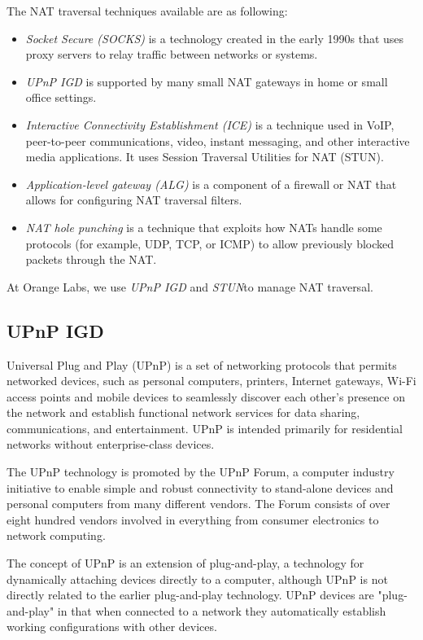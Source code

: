 The NAT traversal techniques available are as following:
\begin{itemize}
  \item \textit{Socket Secure (SOCKS)} is a technology created in the early 1990s that uses proxy servers to relay traffic between networks or systems.
  \item \textit{UPnP IGD} is supported by many small NAT gateways in home or small office settings.
  \item \textit{Interactive Connectivity Establishment (ICE)} is a technique used in VoIP, peer-to-peer communications, video, instant messaging, and other interactive media applications. It uses Session Traversal Utilities for NAT (STUN).
  \item \textit{Application-level gateway (ALG)} is a component of a firewall or NAT that allows for configuring NAT traversal filters.\cite{hu2005nat}
  \item \textit{NAT hole punching} is a technique that exploits how NATs handle some protocols (for example, UDP, TCP, or ICMP) to allow previously blocked packets through the NAT.
\end{itemize}

At Orange Labs, we use \textit{UPnP IGD} and \textit{STUN}to manage NAT traversal.
\subsection{UPnP IGD}

Universal Plug and Play (UPnP)\cite{jeronimo2003upnp} is a set of networking protocols that permits networked devices, such as personal computers, printers, Internet gateways, Wi-Fi access points and mobile devices to seamlessly discover each other's presence on the network and establish functional network services for data sharing, communications, and entertainment. UPnP is intended primarily for residential networks without enterprise-class devices.

The UPnP technology is promoted by the UPnP Forum, a computer industry initiative to enable simple and robust connectivity to stand-alone devices and personal computers from many different vendors. The Forum consists of over eight hundred vendors involved in everything from consumer electronics to network computing.

The concept of UPnP is an extension of plug-and-play, a technology for dynamically attaching devices directly to a computer, although UPnP is not directly related to the earlier plug-and-play technology. UPnP devices are "plug-and-play" in that when connected to a network they automatically establish working configurations with other devices.

